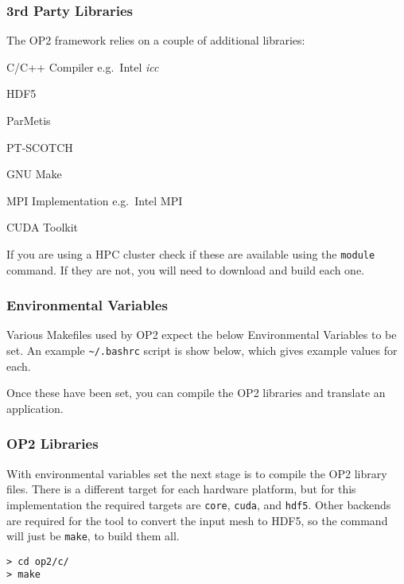 \subsubsection{3rd Party Libraries}
The OP2 framework relies on a couple of additional libraries:
\begin{itemize}
\begin{multicols}{2}
\item{C/C++ Compiler e.g.\ Intel \textit{icc}}
\item{HDF5}
\item{ParMetis}
\item{PT-SCOTCH}
\item{GNU Make}
\item{MPI Implementation e.g.\ Intel MPI}
\item{CUDA Toolkit}
\end{multicols}
\end{itemize}

\noindent If you are using a HPC cluster check if these are available using the \verb|module| command. If they are not, you will need to download and build each one.

\subsubsection{Environmental Variables}
Various Makefiles used by OP2 expect the below Environmental Variables to be set. An example \verb|~/.bashrc| script is show below, which gives example values for each.



\noindent Once these have been set, you can compile the OP2 libraries and translate an application.
\clearpage
\subsubsection{OP2 Libraries}
With environmental variables set the next stage is to compile the OP2 library files. There is a different target for each hardware platform, but for this implementation the required targets are \verb|core|, \verb|cuda|, and \verb|hdf5|. Other backends are required for the tool to convert the input mesh to HDF5, so the command will just be \verb|make|, to build them all.
\begin{verbatim}
> cd op2/c/
> make
\end{verbatim}

